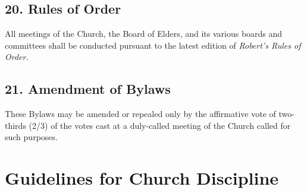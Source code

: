\documentclass[
]{book}
\begin{document}
\hypertarget{rules-of-order}{%
\section{20. Rules of Order}\label{rules-of-order}}

All meetings of the Church, the Board of Elders, and its various boards and committees shall be conducted pursuant to the latest edition of \emph{Robert's Rules of Order.}

\hypertarget{amendment-of-bylaws}{%
\section{21. Amendment of Bylaws}\label{amendment-of-bylaws}}

These Bylaws may be amended or repealed only by the affirmative vote of two-thirds (2/3) of the votes cast at a duly-called meeting of the Church called for such purposes.

\hypertarget{guidelines-for-church-discipline}{%
\chapter{Guidelines for Church Discipline}\label{guidelines-for-church-discipline}}
\end{document}
